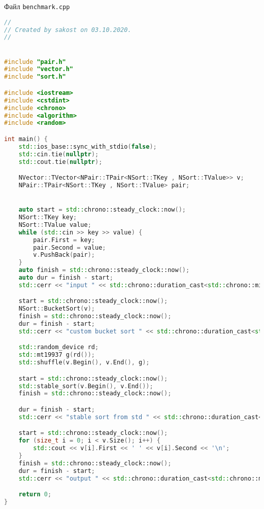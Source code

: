 Файл \texttt{benchmark.cpp}
\begin{lstlisting}[language=C++]
//
// Created by sakost on 03.10.2020.
//


#include "pair.h"
#include "vector.h"
#include "sort.h"

#include <iostream>
#include <cstdint>
#include <chrono>
#include <algorithm>
#include <random>

int main() {
    std::ios_base::sync_with_stdio(false);
    std::cin.tie(nullptr);
    std::cout.tie(nullptr);

    NVector::TVector<NPair::TPair<NSort::TKey , NSort::TValue>> v;
    NPair::TPair<NSort::TKey , NSort::TValue> pair;


    auto start = std::chrono::steady_clock::now();
    NSort::TKey key;
    NSort::TValue value;
    while (std::cin >> key >> value) {
        pair.First = key;
        pair.Second = value;
        v.PushBack(pair);
    }
    auto finish = std::chrono::steady_clock::now();
    auto dur = finish - start;
    std::cerr << "input " << std::chrono::duration_cast<std::chrono::milliseconds>(dur).count() << " ms" << std::endl;

    start = std::chrono::steady_clock::now();
    NSort::BucketSort(v);
    finish = std::chrono::steady_clock::now();
    dur = finish - start;
    std::cerr << "custom bucket sort " << std::chrono::duration_cast<std::chrono::milliseconds>(dur).count() << " ms" << std::endl;

    std::random_device rd;
    std::mt19937 g(rd());
    std::shuffle(v.Begin(), v.End(), g);

    start = std::chrono::steady_clock::now();
    std::stable_sort(v.Begin(), v.End());
    finish = std::chrono::steady_clock::now();

    dur = finish - start;
    std::cerr << "stable sort from std " << std::chrono::duration_cast<std::chrono::milliseconds>(dur).count() << " ms" << std::endl;

    start = std::chrono::steady_clock::now();
    for (size_t i = 0; i < v.Size(); i++) {
        std::cout << v[i].First << ' ' << v[i].Second << '\n';
    }
    finish = std::chrono::steady_clock::now();
    dur = finish - start;
    std::cerr << "output " << std::chrono::duration_cast<std::chrono::milliseconds>(dur).count() << " ms" << std::endl;

    return 0;
}

\end{lstlisting}


